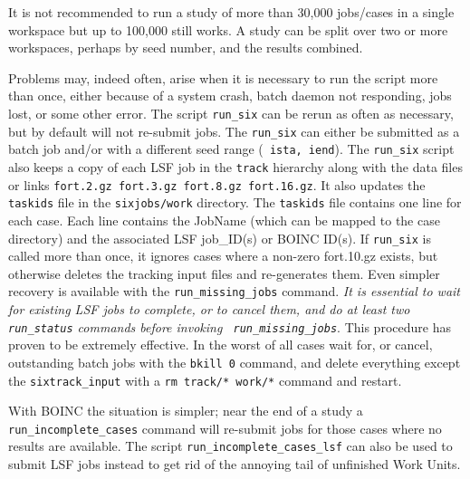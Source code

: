 \documentclass{cernatsnote}
\begin{document}
It is not recommended to run a study of more than 30,000 jobs/cases in a
single workspace but up to 100,000 still works. A study can be split over two
or more workspaces, perhaps by seed number, and the results combined.

Problems may, indeed often, arise when it is necessary to run the script more
than once, either because of a system crash, batch daemon not responding, jobs
lost, or some other error.  The script \texttt{run\_six} can be rerun as often as
necessary, but by default will not re-submit jobs. The \texttt{run\_six} can
either be submitted as a batch job and/or with a different seed range ({\tt
ista, iend}).  The \texttt{run\_six} script also keeps a copy of each LSF job in
the \texttt{track} hierarchy along with the data files or links {\tt fort.2.gz
fort.3.gz fort.8.gz fort.16.gz}.  It also updates the \texttt{taskids} file in
the \texttt{sixjobs/work} directory.  The \texttt{taskids} file contains one
line for each case. Each line contains the JobName (which can be mapped to the
case directory) and the associated LSF job\_ID(s) or BOINC ID(s).  If
\texttt{run\_six} is called more than once, it ignores cases where a non-zero
fort.10.gz exists, but otherwise deletes the tracking input files and
re-generates them. Even simpler recovery is available with the
\texttt{run\_missing\_jobs} command.  \emph{It is essential to wait for
  existing LSF jobs to complete, or to cancel
them, and do at least two \texttt{run\_status} commands before invoking \texttt{
run\_missing\_jobs}}. This procedure has proven to be extremely effective.  In
the worst of all cases wait for, or cancel, outstanding batch jobs with the
\texttt{bkill 0} command, and delete everything except the \texttt{sixtrack\_input}
with a \texttt{rm track/* work/*} command and restart.  

With BOINC the situation is simpler; near the end of a study a
\texttt{run\_incomplete\_cases} command will re-submit jobs for those cases where no
results are available. The script \texttt{run\_incomplete\_cases\_lsf} can also be
used to submit LSF jobs instead to get rid of the annoying tail of
unfinished Work Units.
\end{document}
